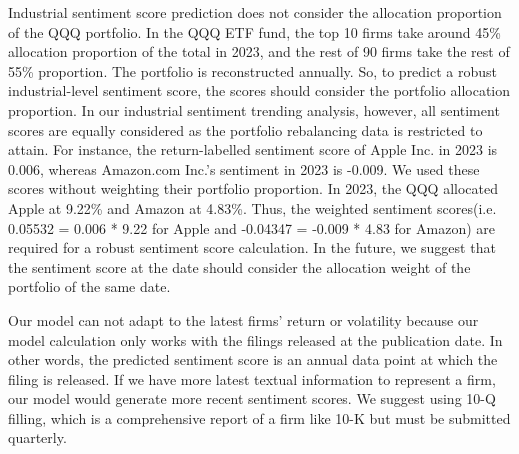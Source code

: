 \documentclass[logo,bsc,singlespacing,parskip]{infthesis}
\begin{document}
Industrial sentiment score prediction does not consider the allocation proportion of the QQQ portfolio. In the QQQ ETF fund, the top 10 firms take around 45\% allocation proportion of the total in 2023, and the rest of 90 firms take the rest of 55\% proportion. The portfolio is reconstructed annually. So, to predict a robust industrial-level sentiment score, the scores should consider the portfolio allocation proportion. In our industrial sentiment trending analysis, however, all sentiment scores are equally considered as the portfolio rebalancing data is restricted to attain. For instance, the return-labelled sentiment score of Apple Inc. in 2023 is 0.006, whereas Amazon.com Inc.’s sentiment in 2023 is -0.009. We used these scores without weighting their portfolio proportion. In 2023, the QQQ allocated Apple at 9.22\% and Amazon at 4.83\%. Thus, the weighted sentiment scores(i.e. 0.05532 = 0.006 * 9.22 for Apple and -0.04347 = -0.009 * 4.83 for Amazon) are required 
for a robust sentiment score calculation. In the future, we suggest that the sentiment score at the date should consider the allocation weight of the portfolio of the same date.  

Our model can not adapt to the latest firms’ return or volatility because our model calculation only works with the filings released at the publication date. In other words, the predicted sentiment score is an annual data point at which the filing is released. If we have more latest textual information to represent a firm, our model would generate more recent sentiment scores. We suggest using 10-Q filling, which is a comprehensive report of a firm like 10-K but must be submitted quarterly.



\end{document}
